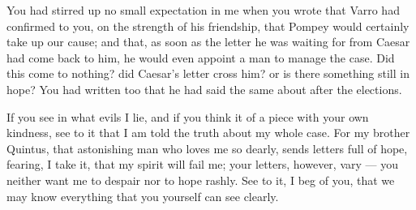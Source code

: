 

 You had stirred up no small expectation in me when you wrote that Varro had confirmed to you, on the strength of his friendship, that Pompey would certainly take up our cause; and that, as soon as the letter he was waiting for from Caesar had come back to him, he would even appoint a man to manage the case. Did this come to nothing? did Caesar's letter cross him? or is there something still in hope? You had written too that he had said the same about after the elections.

 If you see in what evils I lie, and if you think it of a piece with your own kindness, see to it that I am told the truth about my whole case. For my brother Quintus, that astonishing man who loves me so dearly, sends letters full of hope, fearing, I take it, that my spirit will fail me; your letters, however, vary --- you neither want me to despair nor to hope rashly. See to it, I beg of you, that we may know everything that you yourself can see clearly.
